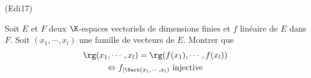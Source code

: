 \begin{tiny}(Edi17)\end{tiny}
Soit $E$ et $F$ deux $\K$-espaces vectoriels de dimensions finies et $f$ linéaire de $E$ dans $F$. Soit $(x_1,\cdots,x_l)$ une famille de vecteurs de $E$. Montrer que
\begin{multline*}
 \rg(x_1,\cdots,x_l)=\rg(f(x_1),\cdots,f(x_l))\\
\Leftrightarrow 
f_{|\Vect(x_1,\cdots,x_l)} \text{ injective}
\end{multline*}
